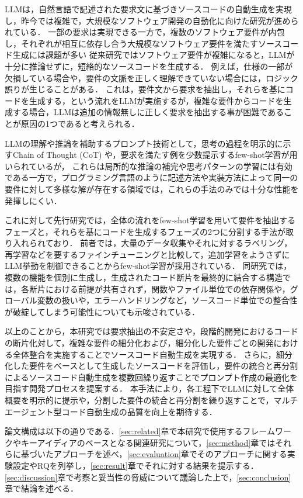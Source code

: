 \documentclass[submit,techrep,noauthor]{ipsj}
\begin{document}
LLMは，自然言語で記述された要求文に基づきソースコードの自動生成を実現し，昨今では複雑で，大規模なソフトウェア開発の自動化に向けた研究が進められている．\cite{LLM_CodeGeneration}
一部の要求は実現できる一方で，複数のソフトウェア要件が内包し，それぞれが相互に依存し合う大規模なソフトウェア要件を満たすソースコード生成には課題が多い
従来研究ではソフトウェア要件が複雑になると，LLMが十分に推論せずに，短絡的なソースコードを生成する．
例えば，仕様の一部が欠損している場合や，要件の文脈を正しく理解できていない場合には，ロジック誤りが生じることがある．
これは，要件文から要求を抽出し，それらを基にコードを生成する，という流れをLLMが実施するが，複雑な要件からコードを生成する場合，LLMは追加の情報無しに正しく要求を抽出する事が困難であることが原因の1つであると考えられる．

LLMの理解や推論を補助するプロンプト技術として，思考の過程を明示的に示すChain of Thought (CoT) や，要求を満たす例を少数提示するfew-shot学習が用いられているが，\cite{LLM_fewshot} これらは局所的な推論の補完や思考パターンの学習には有効である一方で，プログラミング言語のように記述方法や実装方法によって同一の要件に対して多様な解が存在する領域では，これらの手法のみでは十分な性能を発揮しにくい．

これに対して先行研究では，全体の流れをfew-shot学習を用いて要件を抽出するフェーズと，それらを基にコードを生成するフェーズの2つに分割する手法が取り入れられており．\cite{tosem}
前者では，大量のデータ収集やそれに対するラベリング，再学習などを要するファインチューニングと比較して，追加学習をようさずにLLM挙動を制御できることからfew-shot学習が採用されている．
同研究では，複数の機能を個別に生成し，生成されたコード断片を最終的に結合する構造では，各断片における前提が共有されず，関数やファイル単位での依存関係や，グローバル変数の扱いや，エラーハンドリングなど，ソースコード単位での整合性が破綻してしまう可能性についても示唆されている．


以上のことから，本研究では要求抽出の不安定さや，段階的開発におけるコードの断片化対して，複雑な要件の細分化および，細分化した要件ごとの開発における全体整合を実施することでソースコード自動生成を実現する．
さらに，細分化した要件をベースとして生成したソースコードを評価し，要件の統合と再分割によるソースコード自動生成を複数回繰り返すことでプロンプト作成の最適化を目指す開発プロセスを提案する．
本手法により，各工程下でLLMに対して全体概要を明示的に提示や，分割した要件の統合と再分割を繰り返すことで，マルチエージェント型コード自動生成の品質を向上を期待する．


論文構成は以下の通りである．\ref{sec:related}章で本研究で使用するフレームワークやキーアイディアのベースとなる関連研究について，\ref{sec:method}章ではそれらに基づいたアプローチを述べ，\ref{sec:evaluation}章でそのアプローチに関する実験設定やRQを列挙し，\ref{sec:result}章でそれに対する結果を提示する．\ref{sec:discussion}章で考察と妥当性の脅威について議論した上で，\ref{sec:conclusion}章で結論を述べる．
\end{document}
